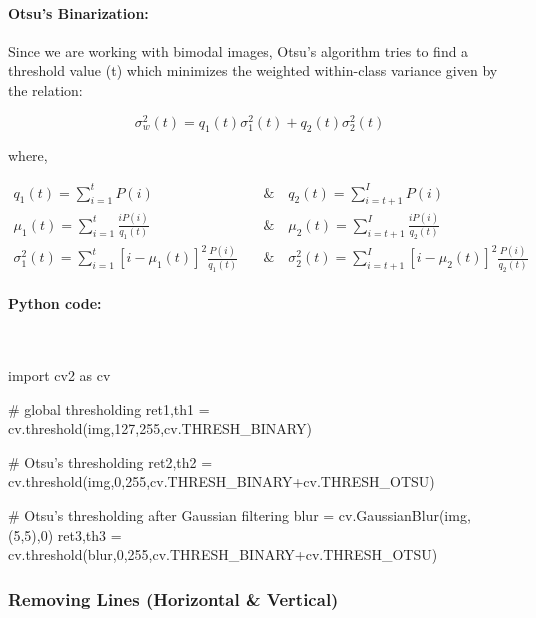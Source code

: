 \documentclass[12pt]{article}
\theoremstyle{mytheoremstyle}
\theoremstyle{mytheoremstyle}
\theoremstyle{myproblemstyle}
\begin{document}
      \paragraph{Otsu's Binarization:}
      Since we are working with bimodal images, Otsu's algorithm tries to find a threshold value (t) which minimizes the weighted within-class variance given by the relation:
      
      \begin{equation*}
        \sigma_w^2(t) = q_1(t)\sigma_1^2(t)+q_2(t)\sigma_2^2(t)
      \end{equation*}
      
      where,
      
      \begin{align*}
        q_1(t) = \sum_{i=1}^{t} P(i) \quad &\& \quad q_2(t) = \sum_{i=t+1}^{I} P(i)
        \\
        \mu_1(t) = \sum_{i=1}^{t} \frac{iP(i)}{q_1(t)} \quad &\& \quad \mu_2(t) = \sum_{i=t+1}^{I} \frac{iP(i)}{q_2(t)}
        \\
        \sigma_1^2(t) = \sum_{i=1}^{t} [i-\mu_1(t)]^2 \frac{P(i)}{q_1(t)} \quad &\& \quad \sigma_2^2(t) = \sum_{i=t+1}^{I} [i-\mu_2(t)]^2 \frac{P(i)}{q_2(t)}
      \end{align*}
      
      \paragraph{Python code:} \
      \begin{python}
        import cv2 as cv

        # global thresholding
        ret1,th1 = cv.threshold(img,127,255,cv.THRESH_BINARY)

        # Otsu's thresholding
        ret2,th2 = cv.threshold(img,0,255,cv.THRESH_BINARY+cv.THRESH_OTSU)

        # Otsu's thresholding after Gaussian filtering
        blur = cv.GaussianBlur(img,(5,5),0)
        ret3,th3 = cv.threshold(blur,0,255,cv.THRESH_BINARY+cv.THRESH_OTSU)
      \end{python}
        
    \subsubsection{Removing Lines (Horizontal \& Vertical)}
      
\end{document}
